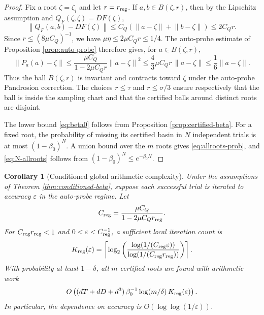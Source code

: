 \documentclass[11pt]{article}
\newtheorem{corollary}[theorem]{Corollary}
\theoremstyle{definition}
\theoremstyle{remark}
\newcommand{\norm}[1]{\left\lVert #1\right\rVert}
\begin{document}
\begin{proof}
Fix a root $\zeta=\zeta_i$ and let $r=r_{\rm reg}$.  If $a,b\in B(\zeta,r)$, then by the Lipschitz assumption and $Q_F(\zeta,\zeta)=DF(\zeta)$,
\[
        \norm{Q_F(a,b)-DF(\zeta)}
        \leq C_Q(\norm{a-\zeta}+\norm{b-\zeta})
        \leq 2C_Q r.
\]
Since $r\leq (8\mu C_Q)^{-1}$, we have $\mu\eta\leq 2\mu C_Q r\leq 1/4$.  The auto-probe estimate of Proposition \ref{prop:auto-probe} therefore gives, for $a\in B(\zeta,r)$,
\[
        \norm{P_a(a)-\zeta}
        \leq \frac{\mu C_Q}{1-2\mu C_Q r}\norm{a-\zeta}^2
        \leq \frac{4}{3}\mu C_Q r\,\norm{a-\zeta}
        \leq \frac{1}{6}\norm{a-\zeta}.
\]
Thus the ball $B(\zeta,r)$ is invariant and contracts toward $\zeta$ under the auto-probe Pandrosion correction.  The choices $r\leq\tau$ and $r\leq\sigma/3$ ensure respectively that the ball is inside the sampling chart and that the certified balls around distinct roots are disjoint.

The lower bound \eqref{eq:beta0} follows from Proposition \ref{prop:certified-beta}.  For a fixed root, the probability of missing its certified basin in $N$ independent trials is at most $(1-\beta_0)^N$.  A union bound over the $m$ roots gives \eqref{eq:allroots-prob}, and \eqref{eq:N-allroots} follows from $(1-\beta_0)^N\leq e^{-\beta_0 N}$.
\end{proof}

\begin{corollary}[Conditioned global arithmetic complexity]\label{cor:conditioned-global-complexity}
Under the assumptions of Theorem \ref{thm:conditioned-beta}, suppose each successful trial is iterated to accuracy $\varepsilon$ in the auto-probe regime.  Let
\[
        C_{\rm reg}=\frac{\mu C_Q}{1-2\mu C_Q r_{\rm reg}}.
\]
For $C_{\rm reg}r_{\rm reg}<1$ and $0<\varepsilon<C_{\rm reg}^{-1}$, a sufficient local iteration count is
\[
        K_{\rm reg}(\varepsilon)
        =\left\lceil
        \log_2\left(
        \frac{\log(1/(C_{\rm reg}\varepsilon))}
             {\log(1/(C_{\rm reg}r_{\rm reg}))}
        \right)
        \right\rceil.
\]
With probability at least $1-\delta$, all $m$ certified roots are found with arithmetic work
\begin{equation}\label{eq:conditioned-work}
        O\left(
        (dT+dD+d^3)\,
        \beta_0^{-1}\log(m/\delta)\,
        K_{\rm reg}(\varepsilon)
        \right).
\end{equation}
In particular, the dependence on accuracy is $O(\log\log(1/\varepsilon))$.
\end{corollary}
\end{document}
